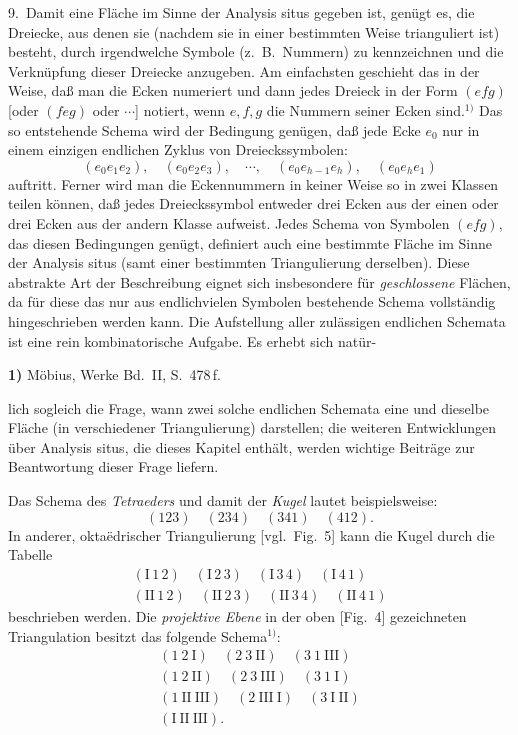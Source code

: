 \documentclass{article}
\begin{document}
9.\ Damit eine Fläche im Sinne der Analysis situs gegeben ist, genügt es, die Dreiecke, aus denen sie (nachdem sie in einer bestimmten Weise trianguliert ist) besteht, durch irgendwelche Symbole (z.\ B.\ Nummern) zu kennzeichnen und die Verknüpfung dieser Dreiecke anzugeben. Am einfachsten geschieht das in der Weise, daß man die Ecken numeriert und dann jedes Dreieck in der Form $(efg)$ [oder $(feg)$ oder $\cdots$] notiert, wenn $e, f, g$ die Nummern seiner Ecken sind.${}^{1)}$ Das so entstehende Schema wird der Bedingung genügen, daß jede Ecke $e_0$ nur in einem einzigen endlichen Zyklus von Dreieckssymbolen:
\[
(e_0 e_1 e_2), \quad (e_0 e_2 e_3), \quad \cdots, \quad (e_0 e_{h-1} e_h), \quad (e_0 e_h e_1)
\]
auftritt. Ferner wird man die Eckennummern in keiner Weise so in zwei Klassen teilen können, daß jedes Dreieckssymbol entweder drei Ecken aus der einen oder drei Ecken aus der andern Klasse aufweist. Jedes Schema von Symbolen $(efg)$, das diesen Bedingungen genügt, definiert auch eine bestimmte Fläche im Sinne der Analysis situs (samt einer bestimmten Triangulierung derselben). Diese abstrakte Art der Beschreibung eignet sich insbesondere für \emph{geschlossene} Flächen, da für diese das nur aus endlichvielen Symbolen bestehende Schema vollständig hingeschrieben werden kann. Die Aufstellung aller zulässigen endlichen Schemata ist eine rein kombinatorische Aufgabe. Es erhebt sich natür-

\textbf{1)} Möbius, Werke Bd.\ II, S.\ 478\,f.

lich sogleich die Frage, wann zwei solche endlichen Schemata eine und dieselbe Fläche (in verschiedener Triangulierung) darstellen; die weiteren Entwicklungen über Analysis situs, die dieses Kapitel enthält, werden wichtige Beiträge zur Beantwortung dieser Frage liefern.

Das Schema des \emph{Tetraeders} und damit der \emph{Kugel} lautet beispielsweise:
\[
(123) \quad (234) \quad (341) \quad (412).
\]
In anderer, oktaëdrischer Triangulierung [vgl.\ Fig.~5] kann die Kugel durch die Tabelle
\[
\begin{gathered}
( \text{I}\,1\,2 ) \quad ( \text{I}\,2\,3 ) \quad ( \text{I}\,3\,4 ) \quad ( \text{I}\,4\,1 ) \\
( \text{II}\,1\,2 ) \quad ( \text{II}\,2\,3 ) \quad ( \text{II}\,3\,4 ) \quad ( \text{II}\,4\,1 )
\end{gathered}
\]
beschrieben werden. Die \emph{projektive Ebene} in der oben [Fig.~4] gezeichneten Triangulation besitzt das folgende Schema${}^{1)}$:
\[
\begin{gathered}
( 1\ 2\ \text{I} ) \quad ( 2\ 3\ \text{II} ) \quad ( 3\ 1\ \text{III} ) \\
( 1\ 2\ \text{II} ) \quad ( 2\ 3\ \text{III} ) \quad ( 3\ 1\ \text{I} ) \\
( 1\ \text{II}\ \text{III} ) \quad ( 2\ \text{III}\ \text{I} ) \quad ( 3\ \text{I}\ \text{II} ) \\
( \text{I}\ \text{II}\ \text{III} ).
\end{gathered}
\]
\end{document}

